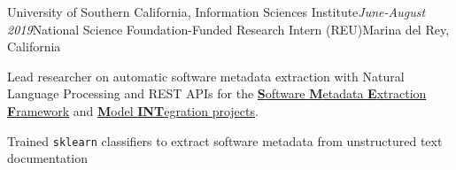 \begin{rSubsection}{University of Southern California, Information Sciences Institute}{\em June-August 2019}{National Science Foundation-Funded Research Intern (REU)}{Marina del Rey, California} 
\item Lead researcher on automatic software metadata extraction  with Natural Language Processing and REST APIs for the \href{https://github.com/KnowledgeCaptureAndDiscovery/somef}{\textbf{S}oftware \textbf{M}etadata \textbf{E}xtraction \textbf{F}ramework} and \href{http://mint-project.info/}{\textbf{M}odel \textbf{INT}egration projects}.
\item Trained \texttt{sklearn} classifiers to extract software metadata from unstructured text documentation 
\end{rSubsection}